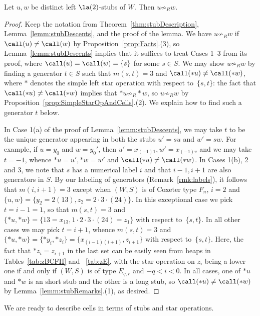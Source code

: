 \begin{prop}
    \label{prop:distinctCells}
    Let $u,w$ be distinct left $\la(2)$-stubs of $W$. Then $u\not\sim_R w$. 
\end{prop}
\begin{proof}
    Keep the notation from Theorem~\ref{thm:stubDescription}, Lemma~\ref{lemm:stubDescents}, and the proof of
    the lemma.  We have $u\not\sim_R w$ if $\call(u)\neq \call(w)$ by Proposition~\ref{prop:Facts}.(3), so
    Lemma~\ref{lemm:stubDescents} implies that it suffices to treat Cases 1--3 from its proof, where
    $\call(u)=\call(w)=\{s\}$ for some $s\in S$. We may show $u\not\sim_R w$ by finding a generator
    $t\in S$ such that $m(s,t)=3$ and $\call(*u)\neq \call(*w)$, where $*$ denotes the simple left
    star operation with respect to~$\{s,t\}$: the fact that $\call(*u)\neq \call(*w)$ implies that
    $*u\not\sim_R *w$, so $u\not\sim_R w$ by Proposition~\ref{prop:SimpleStarOpAndCells}.(2). We explain how to
    find such a generator $t$ below.

    In Case 1(a) of the proof of Lemma~\ref{lemm:stubDescents}, we may take $t$ to be the unique
    generator appearing in both the stubs $u'=su$ and $w'=sw$.  For example, if $u=y_0$ and
    $w=y_0'$, then $u'= x_{(-1)1}, w'=x_{(-1)v}$ and we may take $t=-1$, whence $*u=u', *w=w'$ and
    $\call(*u)\neq \call(*w)$.  In Cases 1(b), 2 and 3, we note that $s$ has a numerical label $i$
    and that $i-1,i+1$ are also generators in $S$. By our labeling of generators
    (Remark~\ref{rmk:labels}), it follows that $m(i,i+1)=3$ except when $(W,S)$ is of Coxeter type $F_n$,
    $i=2$ and $\{u,w\}=\{y_2=2(13),z_2=2\cdot 3\cdot (24)\}$.  In this exceptional case we pick
    $t=i-1=1$, so that $m(s,t)=3$ and $\{*u,*w\}=\{13=x_{13},1\cdot 2\cdot 3\cdot (24)=z_1\}$ with
    respect to~$\{s,t\}$. In all other cases we may pick $t=i+1$, whence $m(s,t)=3$ and
    $\{*u,*w\}=\{*y_i,*z_i\}=\{x_{(i-1)(i+1)},z_{i+1}\}$ with respect to~$\{s,t\}$. Here, the fact
    that $*z_i=z_{i+1}$ in the last set can be easily seen from heaps in Tables~\ref{tab:zBCFH} and
   ~\ref{tab:zE}, with the star operation on $z_i$ being a lower one if and only if $(W,S)$ is of
    type $E_{q,r}$ and $-q<i<0$. In all cases, one of $*u$ and $*w$ is an short stub and the other
    is a long stub, so $\call(*u)\neq \call(*w)$ by Lemma~\ref{lemm:stubRemarks}.(1), as desired.
\end{proof}

We are ready to describe cells in terms of stubs and star operations.

